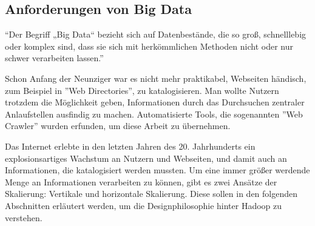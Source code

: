 \subsection{Anforderungen von Big Data}
``Der Begriff „Big Data“ bezieht sich auf Datenbestände, die so groß, schnelllebig oder komplex sind, dass sie sich mit herkömmlichen Methoden nicht oder nur schwer verarbeiten lassen.''\cite{noauthor_big_nodate}
\par 
Schon Anfang der Neunziger war es nicht mehr praktikabel, Webseiten händisch, zum Beispiel in ''Web Directories'', zu katalogisieren. Man wollte Nutzern trotzdem die Möglichkeit geben, Informationen durch das Durchsuchen zentraler Anlaufstellen ausfindig zu machen. Automatisierte Tools, die sogenannten ''Web Crawler'' wurden erfunden, um diese Arbeit zu übernehmen.\cite{griffiths_search_2007}
\par 
Das Internet erlebte in den letzten Jahren des 20. Jahrhunderts ein explosionsartiges Wachstum an Nutzern und Webseiten, und damit auch an Informationen, die katalogisiert werden mussten.\cite{zakon_hobbes_2018} 
Um eine immer größer werdende Menge an Informationen verarbeiten zu können, gibt es zwei Ansätze der Skalierung: Vertikale und horizontale Skalierung. Diese sollen in den folgenden Abschnitten erläutert werden, um die Designphilosophie hinter Hadoop zu verstehen.

